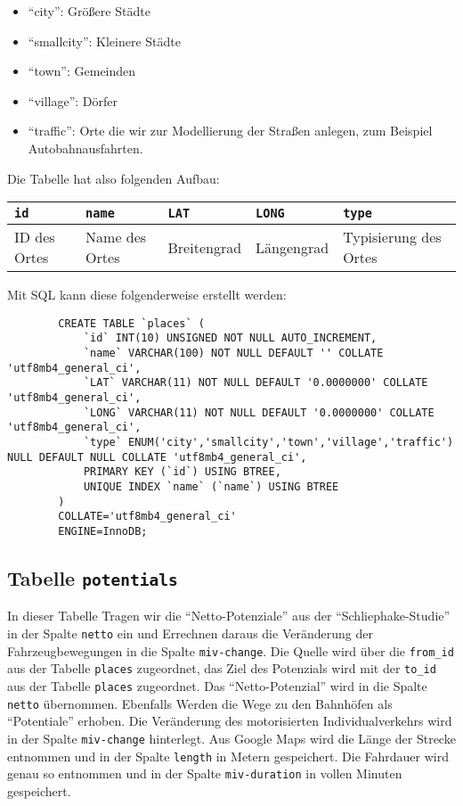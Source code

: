 \documentclass[fontsize=12pt,a4paper]{scrreprt}
\begin{document}
\begin{itemize}
        \item \enquote{city}: Größere Städte
        \item \enquote{smallcity}: Kleinere Städte
        \item \enquote{town}: Gemeinden
        \item \enquote{village}: Dörfer
        \item \enquote{traffic}: Orte die wir zur Modellierung der Straßen anlegen, zum Beispiel Autobahnausfahrten.
\end{itemize}

Die Tabelle hat also folgenden Aufbau:

\begin{table}[htbp]
        \begin{tabular}{|l|l|l|l|l|}\hline
                \texttt{id}  & \texttt{name}  & \texttt{LAT} & \texttt{LONG} & \texttt{type}         \\\hline
                ID des Ortes & Name des Ortes & Breitengrad  & Längengrad    & Typisierung des Ortes \\ \hline
        \end{tabular}
\end{table}

Mit SQL kann diese folgenderweise erstellt werden:
\begingroup
{}
\begin{verbatim}
        CREATE TABLE `places` (
            `id` INT(10) UNSIGNED NOT NULL AUTO_INCREMENT,
            `name` VARCHAR(100) NOT NULL DEFAULT '' COLLATE 'utf8mb4_general_ci',
            `LAT` VARCHAR(11) NOT NULL DEFAULT '0.0000000' COLLATE 'utf8mb4_general_ci',
            `LONG` VARCHAR(11) NOT NULL DEFAULT '0.0000000' COLLATE 'utf8mb4_general_ci',
            `type` ENUM('city','smallcity','town','village','traffic') NULL DEFAULT NULL COLLATE 'utf8mb4_general_ci',
            PRIMARY KEY (`id`) USING BTREE,
            UNIQUE INDEX `name` (`name`) USING BTREE
        )
        COLLATE='utf8mb4_general_ci'
        ENGINE=InnoDB;
    \end{verbatim}
\endgroup

\subsection{Tabelle \texttt{potentials}}

In dieser Tabelle Tragen wir die \enquote{Netto-Potenziale} aus der \enquote{Schliephake-Studie} in der Spalte \texttt{netto} ein und Errechnen daraus die Veränderung der Fahrzeugbewegungen in die Spalte \texttt{miv-change}. Die Quelle wird über die \texttt{from_id} aus der Tabelle \texttt{places} zugeordnet, das Ziel des Potenzials wird mit der \texttt{to_id} aus der Tabelle \texttt{places} zugeordnet. Das \enquote{Netto-Potenzial} wird in die Spalte \texttt{netto} übernommen. Ebenfalls Werden die Wege zu den Bahnhöfen als \enquote{Potentiale} erhoben. Die Veränderung des motorisierten Individualverkehrs wird in der Spalte \texttt{miv-change} hinterlegt. Aus Google Maps wird die Länge der Strecke entnommen und in der Spalte \texttt{length} in Metern gespeichert. Die Fahrdauer wird genau so entnommen und in der Spalte \texttt{miv-duration} in vollen Minuten gespeichert.
\end{document}
